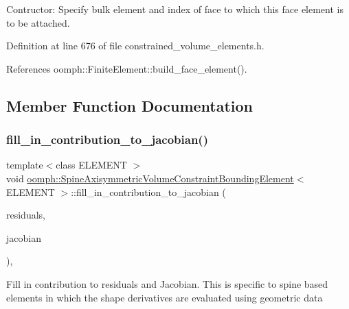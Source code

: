 Contructor\+: Specify bulk element and index of face to which this face element is to be attached. 



Definition at line 676 of file constrained\+\_\+volume\+\_\+elements.\+h.



References oomph\+::\+Finite\+Element\+::build\+\_\+face\+\_\+element().



\subsection{Member Function Documentation}
\mbox{\label{classoomph_1_1SpineAxisymmetricVolumeConstraintBoundingElement_a5813860802c0474ef6ff5f249ca7141f}} 
\subsubsection{\texorpdfstring{fill\+\_\+in\+\_\+contribution\+\_\+to\+\_\+jacobian()}{fill\_in\_contribution\_to\_jacobian()}}
{\footnotesize\ttfamily template$<$class E\+L\+E\+M\+E\+NT $>$ \\
void \hyperlink{classoomph_1_1SpineAxisymmetricVolumeConstraintBoundingElement}{oomph\+::\+Spine\+Axisymmetric\+Volume\+Constraint\+Bounding\+Element}$<$ E\+L\+E\+M\+E\+NT $>$\+::fill\+\_\+in\+\_\+contribution\+\_\+to\+\_\+jacobian (\begin{DoxyParamCaption}\item[{\hyperlink{classoomph_1_1Vector}{Vector}$<$ double $>$ \&}]{residuals,  }\item[{\hyperlink{classoomph_1_1DenseMatrix}{Dense\+Matrix}$<$ double $>$ \&}]{jacobian }\end{DoxyParamCaption})\hspace{0.3cm}{\ttfamily [inline]}, {\ttfamily [virtual]}}

Fill in contribution to residuals and Jacobian. This is specific to spine based elements in which the shape derivatives are evaluated using geometric data 

